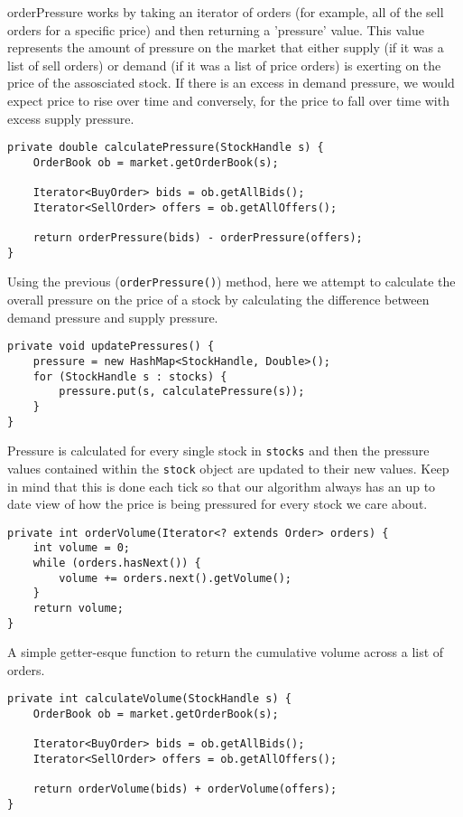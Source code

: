 \documentclass[11pt]{article}
\begin{document}
orderPressure works by taking an iterator of orders (for example, all of the sell orders for a specific price) and then returning a 'pressure' value. This value represents the amount of pressure on the market that either supply (if it was a list of sell orders) or demand (if it was a list of price orders) is exerting on the price of the assosciated stock. If there is an excess in demand pressure, we would expect price to rise over time and conversely, for the price to fall over time with excess supply pressure.\newpage
\begin{lstlisting}
private double calculatePressure(StockHandle s) {
	OrderBook ob = market.getOrderBook(s);
	
	Iterator<BuyOrder> bids = ob.getAllBids();
	Iterator<SellOrder> offers = ob.getAllOffers();
	
	return orderPressure(bids) - orderPressure(offers);
}
\end{lstlisting}
Using the previous (\texttt{orderPressure()}) method, here we attempt to calculate the overall pressure on the price of a stock by calculating the difference between demand pressure and supply pressure.\\
\begin{lstlisting}
private void updatePressures() {
	pressure = new HashMap<StockHandle, Double>();
	for (StockHandle s : stocks) {
		pressure.put(s, calculatePressure(s));
	}
}
\end{lstlisting}
Pressure is calculated for every single stock in \texttt{stocks} and then the pressure values contained within the \texttt{stock} object are updated to their new values. Keep in mind that this is done each tick so that our algorithm always has an up to date view of how the price is being pressured for every stock we care about.\\
\begin{lstlisting}
private int orderVolume(Iterator<? extends Order> orders) {
	int volume = 0;
	while (orders.hasNext()) {
		volume += orders.next().getVolume();
	}
	return volume;
}
\end{lstlisting}
A simple getter-esque function to return the cumulative volume across a list of orders.\newpage
\begin{lstlisting}
private int calculateVolume(StockHandle s) {
	OrderBook ob = market.getOrderBook(s);
	
	Iterator<BuyOrder> bids = ob.getAllBids();
	Iterator<SellOrder> offers = ob.getAllOffers();
	
	return orderVolume(bids) + orderVolume(offers);
}
\end{lstlisting}
\end{document}
